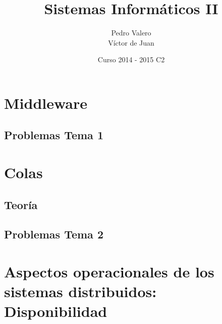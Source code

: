 \documentclass{apuntes}
\title{Sistemas Informáticos II}
\author{Pedro Valero \\ Víctor de Juan}
\date{Curso 2014 - 2015 C2}
\begin{document}
\newpage
\tableofcontents


\chapter{Middleware}



\section{Problemas Tema 1}
\newpage


\chapter{Colas}
\section{Teoría}
\section{Problemas Tema 2}



\chapter{Aspectos operacionales de los sistemas distribuidos: Disponibilidad}


\printindex
\end{document}
